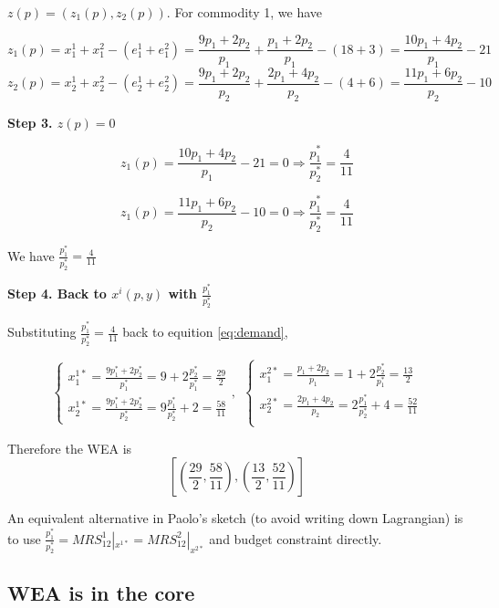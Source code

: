 \documentclass{article}
\begin{document}
$z(p) = (z_1(p),z_2(p))$. For commodity 1, we have

$$z_1(p) = x^1_1 + x^2_1 - (e^1_1 + e^2_1)= \frac{9p_1+2p_2}{p_1} + \frac{p_1+2p_2}{p_1} - (18 +3) = \frac{10p_1+4p_2}{p_1}-21 $$
$$z_2(p) = x^1_2 + x^2_2 - (e^1_2 + e^2_2) = \frac{9p_1+2p_2}{p_2}  + \frac{2p_1+4p_2}{p_2}  - (4+6) = \frac{11p_1+6p_2}{p_2} -10$$

\textbf{Step 3. $z(p) = 0$}


$$z_1(p) = \frac{10p_1+4p_2}{p_1}-21 =0 \Rightarrow \frac{p_1^*}{p_2^*} = \frac{4}{11}$$

$$z_1(p) = \frac{11p_1+6p_2}{p_2} -10 =0 \Rightarrow \frac{p_1^*}{p_2^*} = \frac{4}{11}$$


We have $\frac{p_1^*}{p_2^*} = \frac{4}{11}$

\textbf{Step 4. Back to $x^i(p,y)$ with $\frac{p_1^*}{p_2^*}$}


Substituting $\frac{p_1^*}{p_2^*} = \frac{4}{11}$ back to equition \ref{eq:demand},


\begin{equation}
    \begin{cases}
x^{1*}_1 = \frac{9p^*_1+2p^*_2}{p^*_1} = 9+ 2\frac{p_2^*}{p_1^*} = \frac{29}{2} \\
x^{1*}_2 = \frac{9p^*_1+2p^*_2}{p^*_2} = 9\frac{p_1^*}{p_2^*} +2 =
\frac{58}{11}    \end{cases}
, \ \
    \begin{cases}
x^{2*}_1 = \frac{p_1+2p_2}{p_1} =1 + 2\frac{p_2^*}{p_1^*} = \frac{13}{2} \\
x^{2*}_2 = \frac{2p_1+4p_2}{p_2} =  2\frac{p_1^*}{p_2^*} +4= \frac{52}{11}\\
    \end{cases}
\label{eq:wea}
\end{equation}


Therefore the WEA is $$[(\frac{29}{2},\frac{58}{11} ),(\frac{13}{2},\frac{52}{11})]$$

\begin{mdframed}[backgroundcolor=blue!20,linecolor=white]

An equivalent alternative in Paolo's sketch (to avoid writing down Lagrangian) is to use $\frac{p^*_1}{p^*_2} = MRS^1_{12} |_{x^{1*}} = MRS^2_{12}|_{x^{2*}}$ and budget constraint directly. 

\end{mdframed}


\subsection{WEA is in the core}
\end{document}

